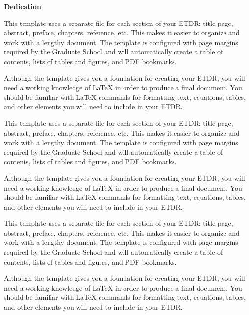 
\newpage
\vspace*{0.9cm}
\begin{center}
{\bf \Huge Dedication}
\end{center}

\setlength{\baselineskip}{0.8cm}



This template uses a separate file for each section of your ETDR:
title page, abstract, preface, chapters, reference, etc.  This
makes it easier to organize and work with a lengthy document.  The
template is configured with page margins required by the Graduate
School and will automatically create a table of contents, lists of
tables and figures, and PDF bookmarks.

Although the template gives you a foundation for creating your
ETDR, you will need a working knowledge of LaTeX in order to
produce a final document.  You should be familiar with LaTeX
commands for formatting text, equations, tables, and other
elements you will need to include in your ETDR.

This template uses a separate file for each section of your ETDR:
title page, abstract, preface, chapters, reference, etc.  This
makes it easier to organize and work with a lengthy document.  The
template is configured with page margins required by the Graduate
School and will automatically create a table of contents, lists of
tables and figures, and PDF bookmarks.

Although the template gives you a foundation for creating your
ETDR, you will need a working knowledge of LaTeX in order to
produce a final document.  You should be familiar with LaTeX
commands for formatting text, equations, tables, and other
elements you will need to include in your ETDR.

This template uses a separate file for each section of your ETDR:
title page, abstract, preface, chapters, reference, etc.  This
makes it easier to organize and work with a lengthy document.  The
template is configured with page margins required by the Graduate
School and will automatically create a table of contents, lists of
tables and figures, and PDF bookmarks.

Although the template gives you a foundation for creating your
ETDR, you will need a working knowledge of LaTeX in order to
produce a final document.  You should be familiar with LaTeX
commands for formatting text, equations, tables, and other
elements you will need to include in your ETDR.
